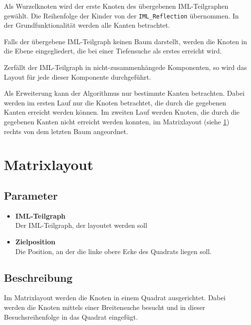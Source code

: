 Als Wurzelknoten wird der erste Knoten des \"ubergebenen IML-Teilgraphen gew\"ahlt. Die Reihenfolge der Kinder von der \texttt{IML\_Reflection} \"ubernommen. In der Grundfunktionalit\"at werden alle Kanten betrachtet.

Falls der \"ubergebene IML-Teilgraph keinen Baum darstellt, werden die Knoten in die Ebene eingegliedert, die bei einer Tiefensuche als erstes erreicht wird.

Zerf\"allt der IML-Teilgraph in nicht-zusammenh\"angede Komponenten, so wird das Layout f\"ur jede dieser Komponente durchgef\"uhrt.

Als Erweiterung kann der Algorithmus nur bestimmte Kanten betrachten. Dabei werden im ersten Lauf nur die Knoten betrachtet, die durch die gegebenen Kanten erreicht werden k\"onnen.
Im zweiten Lauf werden Knoten, die durch die gegebenen Kanten nicht erreicht werden konnten, im Matrixlayout (siehe \ref{Matrixlayout}) rechts von dem letzten Baum angeordnet.

\section{Matrixlayout}
\label{Matrixlayout}
\subsection{Parameter}
\begin{itemize}
  \item \textbf{IML-Teilgraph}\\
Der IML-Teilgraph, der layoutet werden soll
  \item \textbf{Zielposition}\\
Die Position, an der die linke obere Ecke des Quadrats liegen soll.
\end{itemize}

\subsection{Beschreibung}
Im Matrixlayout werden die Knoten in einem Quadrat ausgerichtet.
Dabei werden die Knoten mittels einer Breitensuche besucht und in dieser Besuchsreihenfolge in das Quadrat eingef\"ugt.


